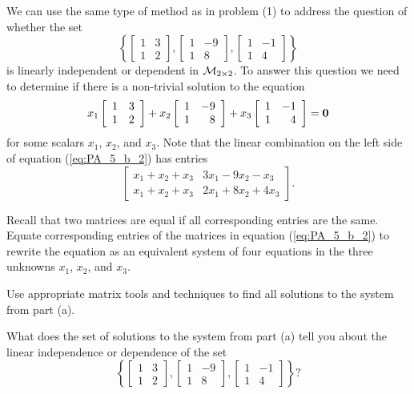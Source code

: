 \begin{pa}
\item We can use the same type of method as in problem (1) to address the question of whether the set 
\[\left\{ \left[ \begin{array}{cc} 1&3 \\ 1&2 \end{array} \right], \left[ \begin{array}{cr} 1&-9 \\ 1&8 \end{array} \right], \left[ \begin{array}{cr} 1&-1 \\ 1&4 \end{array} \right] \right\}\]
is linearly independent or dependent in $\mathcal{M}_{2 \times 2}$. To answer this question we need to determine if there is a non-trivial solution to the equation
\begin{equation} \label{eq:PA_5_b_2}
x_1\left[ \begin{array}{cc} 1&3 \\ 1&2 \end{array} \right] + x_2\left[ \begin{array}{cr} 1&-9 \\ 1&8 \end{array} \right] + x_3 \left[ \begin{array}{cr} 1&-1 \\ 1&4 \end{array} \right] = \mathbf{0}
\end{equation}
for some scalars $x_1$, $x_2$, and $x_3$.  Note that the linear combination on the left side of equation (\ref{eq:PA_5_b_2}) has entries
\[\left[ \begin{array}{cc} x_1+x_2+x_3&3x_1-9x_2-x_3 \\ x_1+x_2+x_3&2x_1+8x_2+4x_3 \end{array} \right].\]
	\ba
	\item Recall that two matrices are equal if all corresponding entries are the same. Equate corresponding entries of the matrices in equation (\ref{eq:PA_5_b_2}) to rewrite the equation as an equivalent system of four equations in the three unknowns $x_1$, $x_2$, and $x_3$. 



	\item Use appropriate matrix tools and techniques to find all solutions to the system from part (a).
	
	
	\item What does the set of solutions to the system from part (a) tell you about the linear independence or dependence of the set 
\[\left\{ \left[ \begin{array}{cc} 1&3 \\ 1&2 \end{array} \right], \left[ \begin{array}{cr} 1&-9 \\ 1&8 \end{array} \right], \left[ \begin{array}{cr} 1&-1 \\ 1&4 \end{array} \right] \right\}?\]
	



\end{pa}
